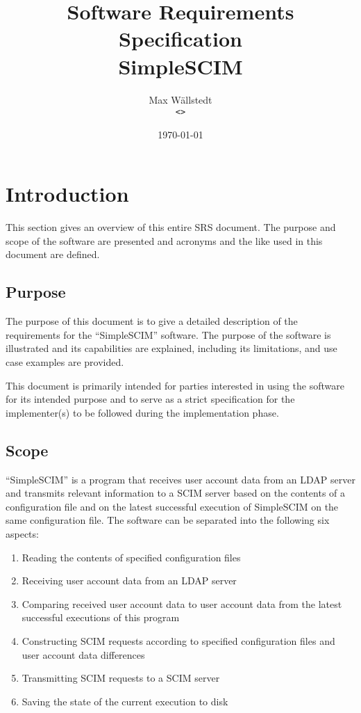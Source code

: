 \documentclass[12pt,twoside,a4paper,titlepage]{article}
\title{Software Requirements Specification \\ \large SimpleSCIM}
\author{Max Wällstedt \\ \texttt{<>}}
\date{\today}
\begin{document}
 \maketitle

 \tableofcontents

 \newpage

 \section{Introduction}

 This section gives an overview of this entire SRS document. The
 purpose and scope of the software are presented and acronyms and the
 like used in this document are defined.

  \subsection{Purpose}

  The purpose of this document is to give a detailed description of
  the requirements for the ``SimpleSCIM'' software. The purpose of
  the software is illustrated and its capabilities are explained,
  including its limitations, and use case examples are provided.

  This document is primarily intended for parties interested in using
  the software for its intended purpose and to serve as a strict
  specification for the implementer(s) to be followed during the
  implementation phase.

  \subsection{Scope}

  ``SimpleSCIM'' is a program that receives user account data from an
  LDAP server and transmits relevant information to a SCIM server
  based on the contents of a configuration file and on the latest
  successful execution of SimpleSCIM on the same configuration file.
  The software can be separated into the following six aspects:

  \begin{enumerate}
   \item
    Reading the contents of specified configuration files

   \item
    Receiving user account data from an LDAP server

   \item
    Comparing received user account data to user account data from
    the latest successful executions of this program

   \item
    Constructing SCIM requests according to specified configuration
    files and user account data differences

   \item
    Transmitting SCIM requests to a SCIM server

   \item
    Saving the state of the current execution to disk
  \end{enumerate}
\end{document}
